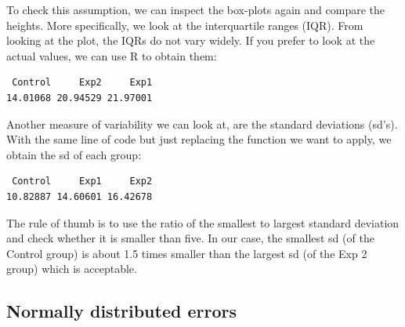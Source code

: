 \documentclass[
  letterpaper,
]{book}
\newenvironment{Shaded}{\begin{snugshade}}{\end{snugshade}}
\newcommand{\FunctionTok}[1]{\textcolor[rgb]{0.13,0.29,0.53}{\textbf{#1}}}
\newcommand{\NormalTok}[1]{#1}
\newcommand{\SpecialCharTok}[1]{\textcolor[rgb]{0.81,0.36,0.00}{\textbf{#1}}}
\begin{document}
To check this assumption, we can inspect the box-plots again and compare
the heights. More specifically, we look at the interquartile ranges
(IQR). From looking at the plot, the IQRs do not vary widely. If you
prefer to look at the actual values, we can use R to obtain them:

\begin{Shaded}
\end{Shaded}

\begin{verbatim}
 Control     Exp2     Exp1 
14.01068 20.94529 21.97001 
\end{verbatim}

Another measure of variability we can look at, are the standard
deviations (sd's). With the same line of code but just replacing the
function we want to apply, we obtain the sd of each group:

\begin{Shaded}
\end{Shaded}

\begin{verbatim}
 Control     Exp1     Exp2 
10.82887 14.60601 16.42678 
\end{verbatim}

The rule of thumb is to use the ratio of the smallest to largest
standard deviation and check whether it is smaller than five. In our
case, the smallest sd (of the Control group) is about 1.5 times smaller
than the largest sd (of the Exp 2 group) which is acceptable.

\subsection*{Normally distributed
errors}\label{normally-distributed-errors}
\end{document}
